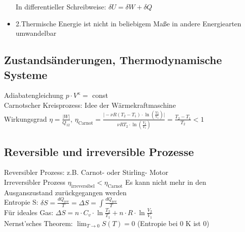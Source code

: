 \documentclass[fs, footer]{latex4ei}
\begin{document}
\begin{multicols*}{4}
\begin{itemize}
In differentieller Schreibweise: $\delta U = \delta W + \delta Q $\\
\item 2.Thermische Energie ist nicht in beliebigem Maße in andere Energiearten umwandelbar
\\
\end{itemize}
\subsection{Zustandsänderungen, Thermodynamische Systeme}
Adiabatengleichung $p\cdot V^\kappa =$ const\\

Carnotscher Kreisprozess: Idee der Wärmekraftmaschine\\
Wirkungsgrad $\eta = \frac{\vert W\vert}{Q_{12}}$, $\eta_{\text{Carnot}} = \frac{\vert -\nu R(T_2-T_1)\cdot\ln(\frac{V_2}{V_1})\vert}{\nu RT_2\cdot\ln(\frac{V_2}{V_1})} = \frac{T_2-T_1}{T_2} < 1$\\
\subsection{Reversible und irreversible Prozesse}
Reversibler Prozess: z.B. Carnot- oder Stirling- Motor\\
Irreversibler Prozess $\eta_{\text{irreversibel}} < \eta_{\text{Carnot}}$ Es kann nicht mehr in den Ausganszustand zurückgegangen werden\\

Entropie S: $\delta S = \frac{dQ_{\text{rev}}}{T} = \Delta S = \int \frac{dQ_{\text{rev}}}{T}$\\
Für ideales Gas: $\Delta S = n\cdot C_v\cdot\ln\frac{T_2}{T_1} + n\cdot R\cdot\ln\frac{V_2}{V_1}$\\
Nernst'sches Theorem: $\lim_{T \rightarrow 0} S(T) = 0$ (Entropie bei 0 K ist 0)\\
\\

\end{multicols*}
\end{document}
